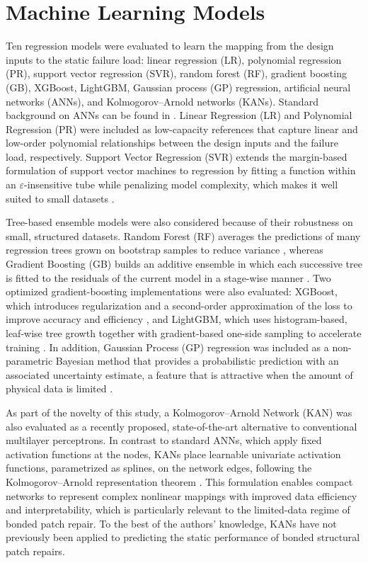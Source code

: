\documentclass[journal,article,submit,pdftex,moreauthors]{Definitions/mdpi}
\begin{document}
\section{Machine Learning Models} 
Ten regression models were evaluated to learn the mapping from the design inputs to the static failure load: linear regression (LR), polynomial regression (PR), support vector regression (SVR), random forest (RF), gradient boosting (GB), XGBoost, LightGBM, Gaussian process (GP) regression, artificial neural networks (ANNs), and Kolmogorov--Arnold networks (KANs). Standard background on ANNs can be found in \cite{uyar2025machine}. Linear Regression (LR) and Polynomial Regression (PR) were included as low-capacity references that capture linear and low-order polynomial relationships between the design inputs and the failure load, respectively. Support Vector Regression (SVR) extends the margin-based formulation of support vector machines to regression by fitting a function within an $\varepsilon$-insensitive tube while penalizing model complexity, which makes it well suited to small datasets \cite{drucker1996support}.

Tree-based ensemble models were also considered because of their robustness on small, structured datasets. Random Forest (RF) averages the predictions of many regression trees grown on bootstrap samples to reduce variance \cite{breiman2001random}, whereas Gradient Boosting (GB) builds an additive ensemble in which each successive tree is fitted to the residuals of the current model in a stage-wise manner \cite{friedman2001greedy}. Two optimized gradient-boosting implementations were also evaluated: XGBoost, which introduces regularization and a second-order approximation of the loss to improve accuracy and efficiency \cite{chen2016xgboost}, and LightGBM, which uses histogram-based, leaf-wise tree growth together with gradient-based one-side sampling to accelerate training \cite{ke2017lightgbm}. In addition, Gaussian Process (GP) regression was included as a non-parametric Bayesian method that provides a probabilistic prediction with an associated uncertainty estimate, a feature that is attractive when the amount of physical data is limited \cite{seeger2004gaussian}.

As part of the novelty of this study, a Kolmogorov--Arnold Network (KAN) was also evaluated as a recently proposed, state-of-the-art alternative to conventional multilayer perceptrons. In contrast to standard ANNs, which apply fixed activation functions at the nodes, KANs place learnable univariate activation functions, parametrized as splines, on the network edges, following the Kolmogorov--Arnold representation theorem \cite{liu2025kan}. This formulation enables compact networks to represent complex nonlinear mappings with improved data efficiency and interpretability, which is particularly relevant to the limited-data regime of bonded patch repair. To the best of the authors' knowledge, KANs have not previously been applied to predicting the static performance of bonded structural patch repairs.
\end{document}

